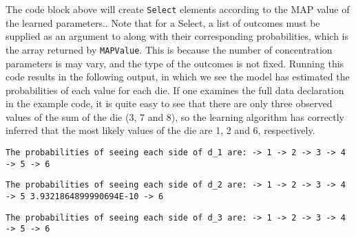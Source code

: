 The code block above will create \texttt{Select} elements according to the MAP value of the learned parameters.. Note that for a Select, a list of outcomes must be supplied as an argument to along with their corresponding probabilities, which is the array returned by \texttt{MAPValue}. This is because the number of concentration parameters is may vary, and the type of the outcomes is not fixed. Running this code results in the following output, in which we see the model has estimated the probabilities of each value for each die. If one examines the full data declaration in the example code, it is quite easy to see that there are only three observed values of the sum of the die (3, 7 and 8), so the learning algorithm has correctly inferred that the most likely values of the die are 1, 2 and 6, respectively.

\begin{flushleft}
\texttt{The probabilities of seeing each side of d\_1 are:
\newline {} -> 1
\newline {} -> 2
\newline {} -> 3
\newline {} -> 4
\newline {} -> 5
\newline {} -> 6
}
\end{flushleft}


\begin{flushleft}
\texttt{The probabilities of seeing each side of d\_2 are:
\newline {} -> 1
\newline {} -> 2
\newline {} -> 3
\newline {} -> 4
\newline {} -> 5
\newline \tab 3.9321864899990694E-10 -> 6
}
\end{flushleft}


\begin{flushleft}
\texttt{The probabilities of seeing each side of d\_3 are:
\newline {} -> 1
\newline {} -> 2
\newline {} -> 3
\newline {} -> 4
\newline {} -> 5
\newline {} -> 6
}
\end{flushleft}













